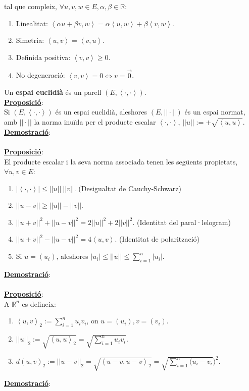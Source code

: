 \documentclass[11pt]{article}
\newcommand{\prop}{\underline{\textbf{Proposició}}:\\}
\newcommand{\dem}{\underline{\textbf{Demostració}}:\\}
\begin{document}
tal que compleix, $\forall u,v,w\in E,\alpha,\beta\in\mathbb{R}$:
\begin{enumerate}
	\item Linealitat: $\left<\alpha u+\beta v,w\right>=\alpha\left<u,w\right>+\beta\left<v,w\right>$.
	\item Simetria: $\left<u,v\right>=\left<v,u\right>$.
	\item Definida positiva: $\left<v,v\right>\geq0$.
	\item No degeneració: $\left<v,v\right>=0\iff v=\vec{0}$.
\end{enumerate}
Un \textbf{espai euclidià} és un parell $(E,\left<\cdot,\cdot\right>)$.\\
\prop Si $(E,\left<\cdot,\cdot\right>)$ és un espai euclidià, aleshores $(E,||\cdot||)$ és un espai normat, amb $||\cdot||$ la norma inuïda per el producte escalar $\left<\cdot,\cdot\right>$, $||u||:=+\sqrt{\left<u,u\right>}$.\\
\dem \\
\prop El producte escalar i la seva norma associada tenen les següents propietats, $\forall u,v\in E$:
\begin{enumerate}
	\item $|\left<\cdot,\cdot\right>|\leq||u||\ ||v||$. (Desigualtat de Cauchy-Schwarz)
	\item $||u-v||\geq||u||-||v||$.
	\item $||u+v||^2+||u-v||^2=2||u||^2+2||v||^2$. (Identitat del paral·lelogram)
	\item $||u+v||^2-||u-v||^2=4\left<u,v\right>$. (Identitat de polarització)
	\item Si $u=(u_i)$, aleshores $|u_i|\leq||u||\leq\sum_{i=1}^n|u_i|$.
\end{enumerate}
\dem \\
\prop A $\mathbb{R}^n$ es defineix:
\begin{enumerate}
	\item $\left<u,v\right>_2:=\sum_{i=1}^nu_iv_i$, on $u=(u_i),v=(v_i)$.
	\item $||u||_2:=\sqrt{\left<u,u\right>_2}=\sqrt{\sum_{i=1}^nu_iv_i}$.
	\item $d(u,v)_2:=||u-v||_2=\sqrt{\left<u-v,u-v\right>_2}=\sqrt{\sum_{i=1}^n(u_i-v_i})^2$.
\end{enumerate}
\dem \\
\end{document}
